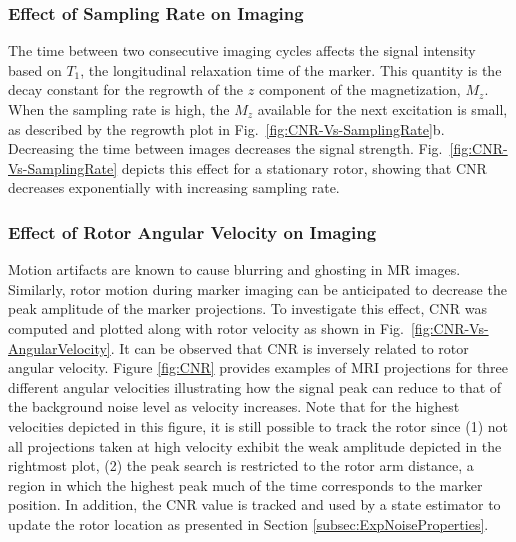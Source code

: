 \documentclass[journal]{IEEEtran}
\begin{document}
\subsubsection{Effect of Sampling Rate on Imaging}\label{subsubsec:ExpImagingSamplingRate}
The time between two consecutive imaging cycles affects the signal intensity based on $T_1$, the longitudinal relaxation time of the marker. This quantity is the decay constant for the regrowth of the $z$ component of the magnetization, $M_z$. When the sampling rate is high, the $M_z$ available for the next excitation is small, as described by the regrowth plot in Fig.\ \ref{fig:CNR-Vs-SamplingRate}b. Decreasing the time between images decreases the signal strength. 
Fig.\ \ref{fig:CNR-Vs-SamplingRate} depicts this effect for a stationary rotor, showing that CNR decreases exponentially with increasing sampling rate.

\subsubsection{ Effect of Rotor Angular Velocity on Imaging}
\label{subsubsec:ExpImagingAngVelocity}
Motion artifacts are known to cause blurring and ghosting in MR images. Similarly, rotor motion during marker imaging can be anticipated to decrease the peak amplitude of the marker projections. To investigate this effect, CNR was computed and plotted along with rotor velocity as shown in Fig.\ \ref{fig:CNR-Vs-AngularVelocity}. It can be observed that CNR is inversely related to rotor angular velocity. Figure \ref{fig:CNR} provides examples of MRI projections for three different angular velocities illustrating how the signal peak can reduce to that of the background noise level as velocity increases. Note that for the highest velocities depicted in this figure, it is still possible to track the rotor since (1) not all projections taken at high velocity exhibit the weak amplitude depicted in the rightmost plot, (2) the peak search is restricted to the rotor arm distance, a region in which the highest peak much of the time corresponds to the marker position. In addition, the CNR value is tracked and used by a state estimator to update the rotor location as presented in Section \ref{subsec:ExpNoiseProperties}.
\end{document}
